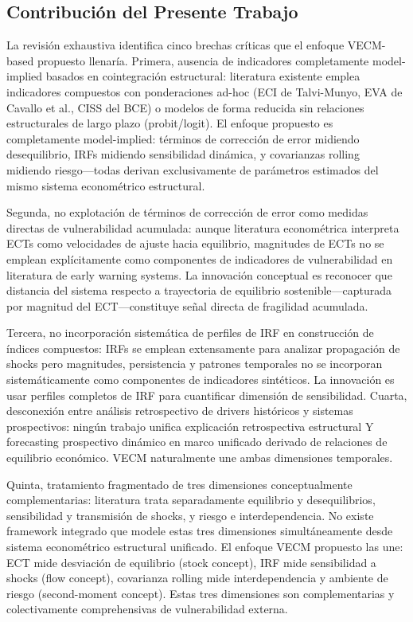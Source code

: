 \documentclass[3p,11pt,draft,natbib=false]{elsarticle}
\begin{document}
\subsection{Contribución del Presente Trabajo}

La revisión exhaustiva identifica cinco brechas críticas que el enfoque VECM-based propuesto llenaría. Primera, ausencia de indicadores completamente model-implied basados en cointegración estructural: literatura existente emplea indicadores compuestos con ponderaciones ad-hoc (ECI de Talvi-Munyo, EVA de Cavallo et al., CISS del BCE) o modelos de forma reducida sin relaciones estructurales de largo plazo (probit/logit). El enfoque propuesto es completamente model-implied: términos de corrección de error midiendo desequilibrio, IRFs midiendo sensibilidad dinámica, y covarianzas rolling midiendo riesgo—todas derivan exclusivamente de parámetros estimados del mismo sistema econométrico estructural.

Segunda, no explotación de términos de corrección de error como medidas directas de vulnerabilidad acumulada: aunque literatura econométrica interpreta ECTs como velocidades de ajuste hacia equilibrio, magnitudes de ECTs no se emplean explícitamente como componentes de indicadores de vulnerabilidad en literatura de early warning systems. La innovación conceptual es reconocer que distancia del sistema respecto a trayectoria de equilibrio sostenible—capturada por magnitud del ECT—constituye señal directa de fragilidad acumulada.

Tercera, no incorporación sistemática de perfiles de IRF en construcción de índices compuestos: IRFs se emplean extensamente para analizar propagación de shocks pero magnitudes, persistencia y patrones temporales no se incorporan sistemáticamente como componentes de indicadores sintéticos. La innovación es usar perfiles completos de IRF para cuantificar dimensión de sensibilidad. Cuarta, desconexión entre análisis retrospectivo de drivers históricos y sistemas prospectivos: ningún trabajo unifica explicación retrospectiva estructural Y forecasting prospectivo dinámico en marco unificado derivado de relaciones de equilibrio económico. VECM naturalmente une ambas dimensiones temporales.

Quinta, tratamiento fragmentado de tres dimensiones conceptualmente complementarias: literatura trata separadamente equilibrio y desequilibrios, sensibilidad y transmisión de shocks, y riesgo e interdependencia. No existe framework integrado que modele estas tres dimensiones simultáneamente desde sistema econométrico estructural unificado. El enfoque VECM propuesto las une: ECT mide desviación de equilibrio (stock concept), IRF mide sensibilidad a shocks (flow concept), covarianza rolling mide interdependencia y ambiente de riesgo (second-moment concept). Estas tres dimensiones son complementarias y colectivamente comprehensivas de vulnerabilidad externa.
\end{document}
